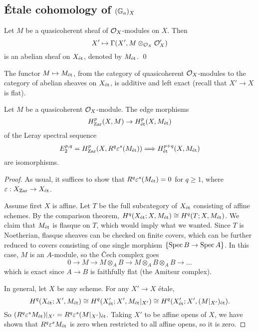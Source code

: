 \documentclass[11pt]{amsart}
\begin{document}
\subsection{\'Etale cohomology of $(\mathbb{G}_a)_X$}

\begin{prop}
    Let $M$ be a quasicoherent sheaf of $\mathcal{O}_X$-modules on $X$. Then
    \[X'\mapsto \Gamma(X', M\otimes_{\mathcal{O}_X} \mathcal{O}_X')\]
    is an abelian sheaf on $X_{\operatorname{\acute{e}t}}$, denoted by $M_{\operatorname{\acute{e}t}}$. \qed
\end{prop}

The functor $M\mapsto M_{\operatorname{\acute{e}t}}$, from the category of quasicoherent $\mathcal{O}_X$-modules to the category of abelian sheaves on $X_{\operatorname{\acute{e}t}}$, is additive and left exact (recall that $X'\to X$ is flat).

\begin{thm}
    Let $M$ be a quasicoherent $\mathcal{O}_X$-module. The edge morphisms
    \[H^p_{\operatorname{Zar}}(X,M) \to H^p_{\operatorname{\acute{e}t}}(X, M_{\operatorname{\acute{e}t}})\]
    of the Leray spectral sequence
    \[E_2^{p,q} = H^p_{\operatorname{Zar}}(X,R^q\varepsilon^s(M_{\operatorname{\acute{e}t}})) \Longrightarrow H^{p+q}_{\operatorname{\acute{e}t}}(X,M_{\operatorname{\acute{e}t}})\]
    are isomorphisms.
\end{thm}

\begin{proof}
    As usual, it suffices to show that $R^q\varepsilon^s(M_{\operatorname{\acute{e}t}}) = 0$ for $q\ge 1$, where $\varepsilon: X_{\operatorname{Zar}} \to X_{\operatorname{\acute{e}t}}$.
    
    Assume first $X$ is affine. Let $T$ be the full subcategory of $X_{\operatorname{\acute{e}t}}$ consisting of affine schemes. By the comparison theorem, $H^q(X_{\operatorname{\acute{e}t}}; X, M_{\operatorname{\acute{e}t}}) \cong H^q(T; X, M_{\operatorname{\acute{e}t}})$. We claim that $M_{\operatorname{\acute{e}t}}$ is flasque on $T$, which would imply what we wanted. Since $T$ is Noetherian, flasque sheaves can be checked on finite covers, which can be further reduced to covers consisting of one single morphism $\{\operatorname{Spec} B\to \operatorname{Spec} A\}$. In this case, $M$ is an $A$-module, so the \v{C}ech complex goes
    \[0\to M\to M\otimes_A B \to M\otimes_A B\otimes_A B\to\dots\]
    which is exact since $A\to B$ is faithfully flat (the Amitsur complex).

    In general, let $X$ be any scheme. For any $X'\to X$ \'etale, 
    \[H^q(X_{\operatorname{\acute{e}t}}; X', M_{\operatorname{\acute{e}t}}) \cong H^q(X'_{\operatorname{\acute{e}t}}; X', M_{\operatorname{\acute{e}t}}|_{X'}) \cong H^q(X'_{\operatorname{\acute{e}t}}; X', (M|_{X'})_{\operatorname{\acute{e}t}}).\]
    So $(R^q\varepsilon^sM_{\operatorname{\acute{e}t}})|_{X'} = R^q\varepsilon^s(M|_{X'})_{\operatorname{\acute{e}t}}$. Taking $X'$ to be affine opens of $X$, we have shown that $R^q\varepsilon^sM_{\operatorname{\acute{e}t}}$ is zero when restricted to all affine opens, so it is zero.
\end{proof}
\end{document}
